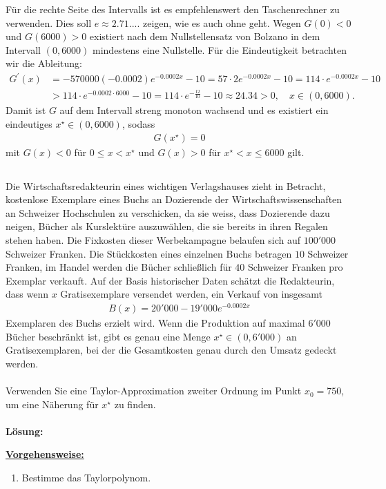 Für die rechte Seite des Intervalls ist es empfehlenswert den Taschenrechner zu verwenden. Dies soll $e \approx 2.71....$ zeigen, wie es auch ohne geht. 
Wegen $G(0) < 0$ und $G(6000) > 0$ existiert nach dem Nullstellensatz von Bolzano in dem Intervall $(0,6000)$ mindestens eine Nullstelle. Für die Eindeutigkeit betrachten wir die Ableitung:
\begin{align*}
	G^\prime(x)
	&=
	-570000 ( - 0.0002) e^{-0.0002 x} - 10
	=
	57 \cdot 2 e^{-0.0002 x} - 10
	=
	114 \cdot e^{-0.0002 x}- 10\\
	&> 
	114 \cdot e^{-0.0002 \cdot 6000} - 10
	=
	114 \cdot e^{-\frac{12}{10}} - 10 \approx 24.34  > 0, 
	\quad x \in ( 0 , 6000).
\end{align*}
Damit ist $G$ auf dem Intervall streng monoton wachsend und es existiert ein eindeutiges $x^\star \in (0,6000) $, sodass 
\begin{align*}
	G(x^\star) = 0
\end{align*} 
mit $G(x) < 0$ für $0 \leq x < x^\star$ und $G(x) > 0$ für $x^\star < x \leq 6000$ gilt.
\newpage

\subsection*{}
Die Wirtschaftsredakteurin eines wichtigen Verlagshauses zieht in Betracht,
kostenlose Exemplare eines Buchs an Dozierende der Wirtschaftswissenschaften an Schweizer Hochschulen zu verschicken, da sie weiss, dass Dozierende dazu neigen, Bücher als Kurslektüre auszuwählen, die sie bereits in ihren Regalen stehen haben. Die Fixkosten dieser Werbekampagne belaufen sich auf $100'000$ Schweizer Franken.
Die Stückkosten eines einzelnen Buchs betragen $10$ Schweizer Franken, im Handel werden die Bücher schließlich für $40$ Schweizer Franken pro Exemplar verkauft.
Auf der Basis historischer Daten schätzt die Redakteurin, dass wenn $x$ Gratisexemplare versendet werden, ein Verkauf von insgesamt
\begin{align*}
	B(x) = 20'000 - 19'000 e^{-0.0002 x }
\end{align*}
Exemplaren des Buchs erzielt wird. Wenn die Produktion auf maximal $6'000$ Bücher beschränkt ist, gibt es genau eine Menge $ x^\star \in (0, 6'000)$ an Gratisexemplaren, bei der die Gesamtkosten genau durch den Umsatz gedeckt werden.\\
\\
Verwenden Sie eine Taylor-Approximation zweiter Ordnung im Punkt $x_0 = 750$, um eine Näherung für $x^\star$ zu finden.
\\
 \\
\textbf{Lösung:}
\begin{mdframed}
\underline{\textbf{Vorgehensweise:}}
\renewcommand{\labelenumi}{\theenumi.}
\begin{enumerate}
\item Bestimme das Taylorpolynom. 
\end{enumerate}
\end{mdframed}

